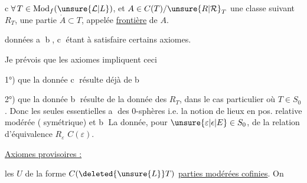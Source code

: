 
\textcircled{\scriptsize c}\quad $\forall\,T\in\mathrm{Mod}_{f}(\unsure{\mathcal L|L})$, et $A\in C(T)/\unsure{R|\mathcal R}_T$
une classe suivant $R_T$, une partie
 $\dot A\subset T$, appelée \uline{frontière} de $A$.

 données \textcircled{\scriptsize a} \textcircled{\scriptsize b}, \textcircled{\scriptsize c} étant 
à satisfaire certains axiomes.

Je prévois que les axiomes impliquent
ceci

1°) que la donnée \textcircled{\scriptsize c} résulte déjà de \textcircled{\scriptsize b}

2°) que la donnée \textcircled{\scriptsize b} résulte de
la donnée des $R_T$,  dans le cas
particulier où $T\in S_0$. Donc
les seules  essentielles 
\textcircled{\scriptsize a}  des 0-sphères i.e. la notion
de  lieux en pos. relative modérée
(  symétrique) et \textcircled{\scriptsize b} La donnée,
pour  $\unsure{\varepsilon|\epsilon|E}\in S_0$, de la relation
d'équivalence $R_{\varepsilon}$  $C(\varepsilon)$.

 \uline{Axiomes provisoires :}

  les $U$ de la forme
$C(\deleted{\unsure{L}}T)$ \uline{parties modérées cofinies}. On

